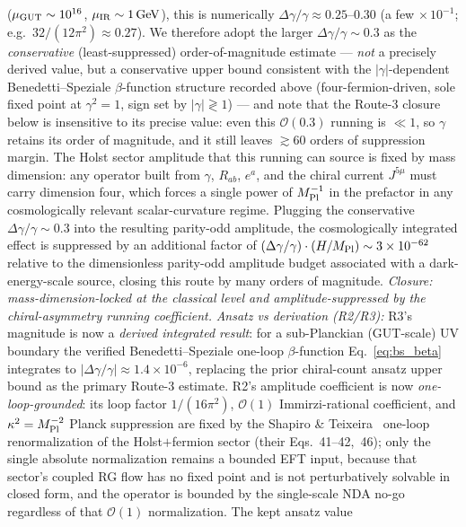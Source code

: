 \documentclass[aps,prd,twocolumn,superscriptaddress,showpacs,preprintnumbers,nofootinbib,longbibliography,floatfix]{revtex4-2}
\begin{document}
($\mu_{\rm GUT}\sim 10^{16}$, $\mu_{\rm IR}\sim 1\,\text{GeV}$),
this is numerically $\Delta\gamma/\gamma \approx 0.25$--$0.30$
(a few$\,\times 10^{-1}$; e.g.\ $32/(12\pi^2)\approx 0.27$).
We therefore adopt the larger $\Delta\gamma/\gamma \sim 0.3$ as the
\emph{conservative} (least-suppressed) order-of-magnitude estimate ---
\emph{not} a precisely derived value, but a conservative upper bound
consistent with the $|\gamma|$-dependent Benedetti--Speziale
$\beta$-function structure recorded above (four-fermion-driven, sole
fixed point at $\gamma^2=1$, sign set by $|\gamma|\gtrless 1$) ---
and note that the Route-3
closure below is insensitive to its precise value: even this
$\mathcal{O}(0.3)$ running is $\ll 1$, so $\gamma$ retains its order of
magnitude, and it still leaves $\gtrsim 60$ orders of suppression margin. The Holst sector amplitude that this running can source is
fixed by mass dimension: any operator built from
$\gamma$, $R_{ab}$, $e^a$, and the chiral current $J^{5\mu}$ must carry
dimension four, which forces a single power of $M_{\rm Pl}^{-1}$ in
the prefactor in any cosmologically relevant scalar-curvature regime.
Plugging the conservative $\Delta\gamma/\gamma \sim 0.3$ into the resulting
parity-odd amplitude, the cosmologically integrated effect is
suppressed by an additional factor of
$(\Delta\gamma/\gamma)\cdot(H/M_{\rm Pl}) \sim 3\times 10^{-62}$ relative to
the dimensionless parity-odd amplitude budget associated with a
dark-energy-scale source, closing this route by many orders of
magnitude. \emph{Closure: mass-dimension-locked at the classical level
and amplitude-suppressed by the chiral-asymmetry running coefficient.}
\emph{Ansatz vs derivation (R2/R3):} R3's magnitude is now a
\emph{derived integrated result}: for a sub-Planckian (GUT-scale) UV
boundary the verified Benedetti--Speziale one-loop $\beta$-function
Eq.~\eqref{eq:bs_beta} integrates to $|\Delta\gamma/\gamma|\approx
1.4\times10^{-6}$, replacing the prior chiral-count ansatz upper bound as
the primary Route-3 estimate. R2's amplitude coefficient is now
\emph{one-loop-grounded}: its loop factor $1/(16\pi^2)$,
$\mathcal{O}(1)$ Immirzi-rational coefficient, and
$\kappa^2=M_{\rm Pl}^{-2}$ Planck suppression are fixed by the Shapiro
\& Teixeira~\cite{ShapiroTeixeira2014} one-loop renormalization of the
Holst${+}$fermion sector (their Eqs.~41--42,~46); only the single
absolute normalization remains a bounded EFT input, because that
sector's coupled RG flow has no fixed point and is not perturbatively
solvable in closed form, and the operator is bounded by the single-scale
NDA no-go regardless of that $\mathcal{O}(1)$ normalization. The kept ansatz value
\end{document}
